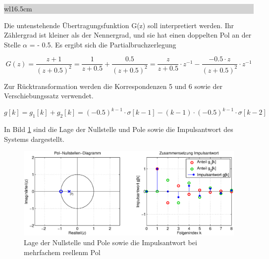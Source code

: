 \noindent
\colorbox{lightgray}{%
%
\renewcommand\arraystretch{0.6}%
\begin{tabular}{ wl{16.5cm} }
{}
\end{tabular}%
}\medskip

\noindent Die untenstehende \"{U}bertragungsfunktion G(z) soll interpretiert werden. Ihr Z\"{a}hlergrad ist kleiner als der Nennergrad, und sie hat einen doppelten Pol an der Stelle $\alpha$ = - 0.5. Es ergibt sich die Partialbruchzerlegung

\begin{equation}\label{eq:sixsninetynine}
G\left(z\right)=\frac{z+1}{\left(z+0.5\right)^{2} } =\frac{1}{z+0.5} +\frac{0.5}{\left(z+0.5\right)^{2} } =\frac{z}{z+0.5} \cdot z^{-1} -\frac{-0.5\cdot z}{\left(z+0.5\right)^{2} } \cdot z^{-1}
\end{equation}

\noindent Zur R\"{u}cktransformation werden die Korrespondenzen 5 und 6 sowie der Verschiebungssatz verwendet.

\begin{equation}\label{eq:sixsonehundred}
g\left[k\right]=g_{1} \left[k\right]+g_{2} \left[k\right]=\left(-0.5\right)^{k-1} \cdot \sigma \left[k-1\right]-(k-1)\cdot \left(-0.5\right)^{k-1} \cdot \sigma \left[k-2\right]
\end{equation}

\noindent In Bild \ref{fig:SystemDoppelteReellePole} sind die Lage der Nullstelle und Pole sowie die Impulsantwort des Systems dargestellt.

\begin{figure}[H]
  \centerline{\includegraphics[width=1\textwidth]{Kapitel6/Bilder/image11.eps}}
  \caption{Lage der Nullstelle und Pole sowie die Impulsantwort bei mehrfachem reellenm Pol}
  \label{fig:SystemDoppelteReellePole}
\end{figure}

